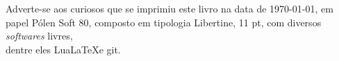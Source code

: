 \pagebreak

\ifodd\thepage\blankpage\fi

\parindent=0pt
\footnotesize\thispagestyle{empty}









\mbox{}\vfill
\begin{center}
		\begin{minipage}{.7\textwidth}\tiny\noindent{}
		\centering\tiny
Adverte-se aos curiosos que se imprimiu este livro na data de \today, em papel 
		Pólen Soft 80, composto em tipologia Libertine, 11 pt,
		com diversos \textit{softwares} livres,\\
		dentre eles Lua\LaTeX e git.\\ 
		\medskip\\\
		\end{minipage}
\end{center}
